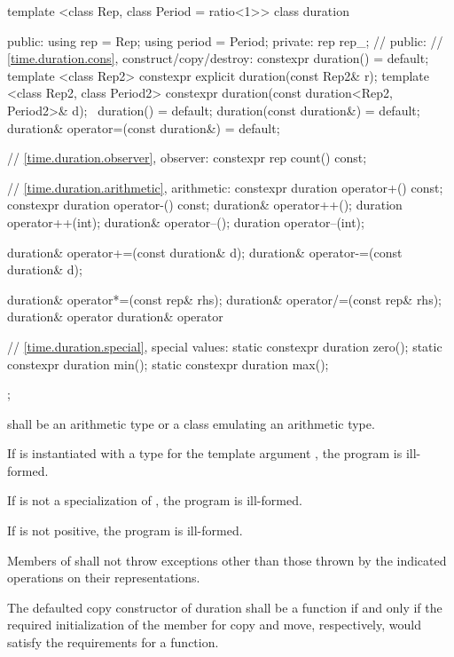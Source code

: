 %
\begin{codeblock}
template <class Rep, class Period = ratio<1>>
class duration {
public:
  using rep    = Rep;
  using period = Period;
private:
  rep rep_;  // \expos
public:
  // \ref{time.duration.cons}, construct/copy/destroy:
  constexpr duration() = default;
  template <class Rep2>
      constexpr explicit duration(const Rep2& r);
  template <class Rep2, class Period2>
     constexpr duration(const duration<Rep2, Period2>& d);
  ~duration() = default;
  duration(const duration&) = default;
  duration& operator=(const duration&) = default;

  // \ref{time.duration.observer}, observer:
  constexpr rep count() const;

  // \ref{time.duration.arithmetic}, arithmetic:
  constexpr duration  operator+() const;
  constexpr duration  operator-() const;
  duration& operator++();
  duration  operator++(int);
  duration& operator--();
  duration  operator--(int);

  duration& operator+=(const duration& d);
  duration& operator-=(const duration& d);

  duration& operator*=(const rep& rhs);
  duration& operator/=(const rep& rhs);
  duration& operator%
  duration& operator%

  // \ref{time.duration.special}, special values:
  static constexpr duration zero();
  static constexpr duration min();
  static constexpr duration max();
};
\end{codeblock}

\begin{itemdescr}
\pnum
\requires {} shall be an arithmetic type or a class emulating an arithmetic type.

\pnum
\remarks If  is instantiated with a  type for the template
argument , the program is ill-formed.

\pnum
\remarks If  is not a specialization of , the program is ill-formed.

\pnum
\remarks If  is not positive, the program is ill-formed.

\pnum
\requires Members of  shall not throw exceptions other than
those thrown by the indicated operations on their representations.

\pnum
\remarks The defaulted copy constructor of duration shall be a
 function if and only if the required initialization
of the member  for copy and move, respectively, would
satisfy the requirements for a  function.
\end{itemdescr}

